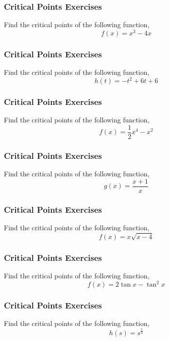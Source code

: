 \documentclass[xcolor=dvipsnames]{beamer}
\begin{document}
\begin{frame}
  \frametitle{Critical Points Exercises}
{\ubung} Find the critical points of the following function,
\begin{equation}
  \label{eq:xoongohh}
f(x)=x^{3}-4x
\end{equation}
\end{frame}

\begin{frame}
  \frametitle{Critical Points Exercises}
{\ubung} Find the critical points of the following function,
\begin{equation}
  \label{eq:aghuomoh}
h(t)=-t^{2}+6t+6
\end{equation}
\end{frame}

\begin{frame}
  \frametitle{Critical Points Exercises}
{\ubung} Find the critical points of the following function,
\begin{equation}
  \label{eq:yakovuap}
f(x)=\frac{1}{2}x^{4}-x^{2}
\end{equation}
\end{frame}

\begin{frame}
  \frametitle{Critical Points Exercises}
{\ubung} Find the critical points of the following function,
\begin{equation}
  \label{eq:aweefahx}
g(x)=\frac{x+1}{x}
\end{equation}
\end{frame}

\begin{frame}
  \frametitle{Critical Points Exercises}
{\ubung} Find the critical points of the following function,
\begin{equation}
  \label{eq:ebukatio}
f(x)=x\sqrt{x-4}
\end{equation}
\end{frame}

\begin{frame}
  \frametitle{Critical Points Exercises}
{\ubung} Find the critical points of the following function,
\begin{equation}
  \label{eq:imeecohd}
f(x)=2\tan{}x-\tan^{2}x
\end{equation}
\end{frame}

\begin{frame}
  \frametitle{Critical Points Exercises}
{\ubung} Find the critical points of the following function,
\begin{equation}
  \label{eq:inaidimo}
h(s)=s^{\frac{5}{3}}
\end{equation}
\end{frame}
\end{document}
